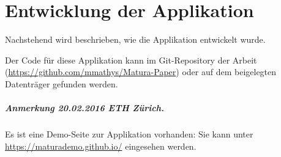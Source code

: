 \chapter{Entwicklung der Applikation}

Nachstehend wird beschrieben, wie die Applikation entwickelt wurde.

Der Code für diese Applikation kann im Git-Repository der Arbeit (\url{https://github.com/mmathys/Matura-Paper}) oder auf dem beigelegten Datenträger gefunden werden.

\paragraph{Anmerkung 20.02.2016 ETH Zürich.}
Es ist eine Demo-Seite zur Applikation vorhanden: Sie kann unter \url{https://maturademo.github.io/} eingesehen werden.
 








% 